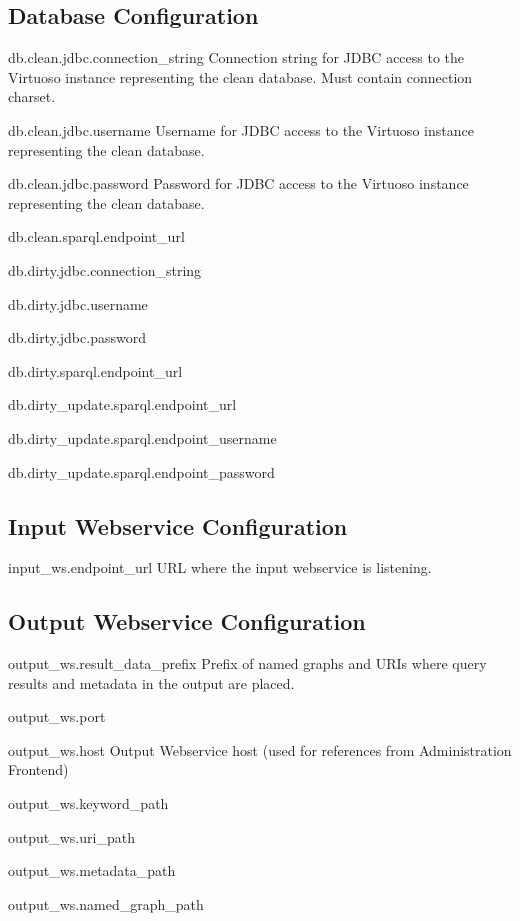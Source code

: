 \subsection*{Database Configuration}
\begin{configlist}
	\item[db.clean.jdbc.connection\_string]
	  Connection string for JDBC access to the Virtuoso instance representing the clean database. Must contain connection charset.
	\item[db.clean.jdbc.username]
	  Username for JDBC access to the Virtuoso instance representing the clean database.
	\item[db.clean.jdbc.password]
	  Password for JDBC access to the Virtuoso instance representing the clean database.
	\item[db.clean.sparql.endpoint\_url]

	\item[db.dirty.jdbc.connection\_string]
	\item[db.dirty.jdbc.username]
	\item[db.dirty.jdbc.password]
	\item[db.dirty.sparql.endpoint\_url]
	\item[db.dirty\_update.sparql.endpoint\_url]
	\item[db.dirty\_update.sparql.endpoint\_username]
	\item[db.dirty\_update.sparql.endpoint\_password]
\end{configlist}

\subsection*{Input Webservice Configuration}
\begin{configlist}
	\item[input\_ws.endpoint\_url]
		URL where the input webservice is listening.
\end{configlist}

\subsection*{Output Webservice Configuration}
\begin{configlist}
	\item[output\_ws.result\_data\_prefix]
		Prefix of named graphs and URIs where query results and metadata in the output are placed.
	\item[output\_ws.port]
	\item[output\_ws.host]
		Output Webservice host (used for references from Administration Frontend)
	\item[output\_ws.keyword\_path]
	\item[output\_ws.uri\_path]
	\item[output\_ws.metadata\_path]
	\item[output\_ws.named\_graph\_path]
\end{configlist}

